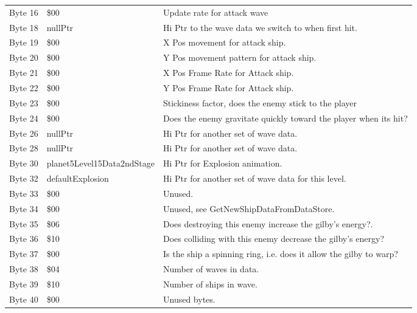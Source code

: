 \begin{figure}[H]
{\begin{adjustbox}{width=12cm}
\begin{tabular}{lll}
 Byte 16 & \$00                        & Update rate for attack wave                                        \\
 Byte 18 & nullPtr                    & Hi Ptr to the wave data we switch to when first hit.               \\
 Byte 19 & \$00                        & X Pos movement for attack ship.                                    \\
 Byte 20 & \$00                        & Y Pos movement pattern for attack ship.                            \\
 Byte 21 & \$00                        & X Pos Frame Rate for Attack ship.                                  \\
 Byte 22 & \$00                        & Y Pos Frame Rate for Attack ship.                                  \\
 Byte 23 & \$00                        & Stickiness factor, does the enemy stick to the player              \\
 Byte 24 & \$00                        & Does the enemy gravitate quickly toward the player when its hit?   \\
 Byte 26 & nullPtr                    & Hi Ptr for another set of wave data.                               \\
 Byte 28 & nullPtr                    & Hi Ptr for another set of wave data.                               \\
 Byte 30 & planet5Level15Data2ndStage & Hi Ptr for Explosion animation.                                    \\
 Byte 32 & defaultExplosion           & Hi Ptr for another set of wave data for this level.                \\
 Byte 33 & \$00                        & Unused.                                                            \\
 Byte 34 & \$00                        & Unused, see GetNewShipDataFromDataStore.                           \\
 Byte 35 & \$06                        & Does destroying this enemy increase the gilby's energy?.           \\
 Byte 36 & \$10                        & Does colliding with this enemy decrease the gilby's energy?        \\
 Byte 37 & \$00                        & Is the ship a spinning ring, i.e. does it allow the gilby to warp? \\
 Byte 38 & \$04                        & Number of waves in data.                                           \\
 Byte 39 & \$10                        & Number of ships in wave.                                           \\
 Byte 40 & \$00                        & Unused bytes.                                                      \\
\bottomrule
\end{tabular}


\end{adjustbox}}
\end{figure}
